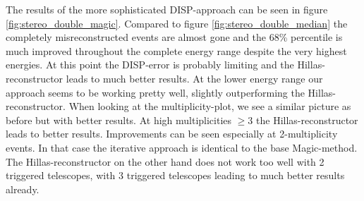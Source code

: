 The results of the more sophisticated DISP-approach can be seen in figure \ref{fig:stereo_double_magic}.
Compared to figure \ref{fig:stereo_double_median} the completely misreconstructed events are almost
gone and the 68\% percentile is much improved throughout the complete energy range despite 
the very highest energies. At this point the DISP-error is probably limiting and the 
Hillas-reconstructor leads to much better results.
At the lower energy range our approach seems to be working pretty well, 
slightly outperforming the Hillas-reconstructor.
When looking at the multiplicity-plot, we see a similar picture as before but with 
better results. At high multiplicities $\ge 3$ the Hillas-reconstructor 
leads to better results. Improvements can be seen especially at 2-multiplicity 
events. In that case the iterative approach is identical to the 
base Magic-method.
The Hillas-reconstructor on the other hand does not work too well with 2 
triggered telescopes, with 3 triggered telescopes leading to much better results 
already.



